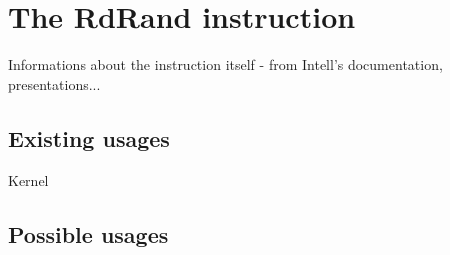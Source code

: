 \chapter{The RdRand instruction}  \label{sec:rdrand-instruction}
Informations about the instruction itself - from Intell's documentation, presentations...

\section{Existing usages} 
Kernel
\section{Possible usages}

